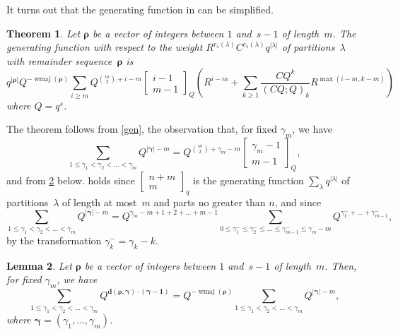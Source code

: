 \documentclass[12pt,reqno]{amsart}
\numberwithin{equation}{section}
\newtheorem{theorem}{Theorem}
\newtheorem{lemma}[theorem]{Lemma}
\theoremstyle{definition}
\DeclareMathOperator{\wmaj}{wmaj}
\newcommand{\rem}{{\boldsymbol\rho}}
\newcommand{\pos}{{\boldsymbol\gamma}}
\newcommand{\posi}{{\gamma}}
\begin{document}
It turns out that the generating function in  can be simplified.

\begin{theorem}
\label{theogen}
Let $\rem$ be a vector of integers between $1$ and~$s-1$ of length~$m$. The generating function
with respect to the
weight $R^{r_s(\lambda)} C^{c_s(\lambda)} q^{|\lambda|}$
of partitions~$\lambda$ with remainder sequence~$\rem$ is
$$
q^{|\rem|} Q^{-\wmaj(\rem)}  \sum_{i \ge m} Q^{\binom{m}{2}+i-m}
 \begin{bmatrix} i-1 \\ m-1 \end{bmatrix}_Q
\left( R^{i-m} +  \sum_{k \ge 1}  \frac{C Q^{k}}{(C Q; Q)_k}
R^{\max(i-m,k-m)} \right)
$$
where $Q=q^s$.
\end{theorem}


The theorem follows from \cref{gen},
the observation that,
for fixed $\posi_m$, we have
\begin{equation}
\label{qbin}
\sum_{1 \le \posi_1 < \posi_2 < \dots < \posi_m} Q^{|\pos|-m}
= Q^{\binom{m}{2}+\posi_m-m}  \begin{bmatrix} \posi_m-1 \\ m-1 \end{bmatrix}_Q,
\end{equation}
and from \cref{maj} below.
 holds
since $\left[\begin{smallmatrix} n+m \\ m\end{smallmatrix} \right]_q$
is the generating function $\sum_\lambda q^{|\lambda|}$ of
partitions~$\lambda$ of length at most~$m$ and parts no greater than
$n$, and since
$$
\sum_{1 \le \posi_1 < \posi_2 < \dots < \posi_m} Q^{|\pos|-m} =
Q^{\posi_m-m+1+2+\dots+m-1} \sum_{0 \le \posi^-_1 \le \posi^-_2 \le  \dots \le  \posi^-_{m-1} \le \posi_m-m} Q^{\posi^-_1+\dots+\posi^-_{m-1}},
$$
by the transformation $\posi^-_k=\posi_k-k$.

\begin{lemma}
\label{maj}
Let $\rem$ be a vector of integers between $1$ and~$s-1$ of length~$m$. Then, for fixed $\posi_m$, we have
$$
\sum_{1 \le \posi_1 < \posi_2 < \dots < \posi_m} Q^{{\mathbf d}(\rem,\pos) \cdot ({\pos- \mathbf 1})} =
Q^{-\wmaj(\rem)} \sum_{1 \le \posi_1 < \posi_2 < \dots < \posi_m} Q^{|\pos|-m},
$$
where $\pos=(\posi_1,\dots,\posi_m)$.
\end{lemma}
\end{document}
